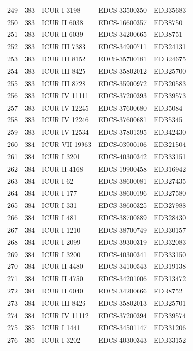 \begin{longtable}{@{}r r l l l@{}}
249 & 383 & ICUR I 3198 & EDCS-33500350 & EDB35683 \\
250 & 383 & ICUR II 6038 & EDCS-16600357 & EDB8750 \\
251 & 383 & ICUR II 6039 & EDCS-34200665 & EDB8751 \\
252 & 383 & ICUR III 7383 & EDCS-34900711 & EDB24131 \\
253 & 383 & ICUR III 8152 & EDCS-35700181 & EDB24675 \\
254 & 383 & ICUR III 8425 & EDCS-35802012 & EDB25700 \\
255 & 383 & ICUR III 8728 & EDCS-35900972 & EDB20583 \\
256 & 383 & ICUR IV 11111 & EDCS-37200393 & EDB39573 \\
257 & 383 & ICUR IV 12245 & EDCS-37600680 & EDB5084 \\
258 & 383 & ICUR IV 12246 & EDCS-37600681 & EDB5345 \\
259 & 383 & ICUR IV 12534 & EDCS-37801595 & EDB42430 \\
260 & 384 & ICUR VII 19963 & EDCS-03900106 & EDB21504 \\
261 & 384 & ICUR I 3201 & EDCS-40300342 & EDB33151 \\
262 & 384 & ICUR II 4168 & EDCS-19900458 & EDB16942 \\
263 & 384 & ICUR I 62 & EDCS-38600081 & EDB27435 \\
264 & 384 & ICUR I 177 & EDCS-38600196 & EDB27580 \\
265 & 384 & ICUR I 331 & EDCS-38600325 & EDB27988 \\
266 & 384 & ICUR I 481 & EDCS-38700889 & EDB28430 \\
267 & 384 & ICUR I 1210 & EDCS-38700749 & EDB30157 \\
268 & 384 & ICUR I 2099 & EDCS-39300319 & EDB32083 \\
269 & 384 & ICUR I 3200 & EDCS-40300341 & EDB33150 \\
270 & 384 & ICUR II 4480 & EDCS-34100543 & EDB19138 \\
271 & 384 & ICUR II 4750 & EDCS-34201006 & EDB13472 \\
272 & 384 & ICUR II 6040 & EDCS-34200666 & EDB8752 \\
273 & 384 & ICUR III 8426 & EDCS-35802013 & EDB25701 \\
274 & 384 & ICUR IV 11112 & EDCS-37200394 & EDB39574 \\
275 & 385 & ICUR I 1441 & EDCS-34501147 & EDB31206 \\
276 & 385 & ICUR I 3202 & EDCS-40300343 & EDB33152 \\

\end{longtable}
